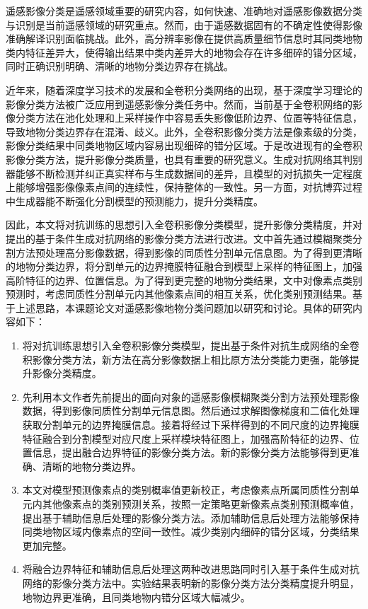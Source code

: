 \begin{cabstract}
  遥感影像分类是遥感领域重要的研究内容，如何快速、准确地对遥感影像数据分类与识别是当前遥感领域的研究重点。然而，由于遥感数据固有的不确定性使得影像准确解译识别面临挑战。此外，高分辨率影像在提供高质量细节信息时其同类地物类内特征差异大，使得输出结果中类内差异大的地物会存在许多细碎的错分区域，同时正确识别明确、清晰的地物分类边界存在挑战。

  近年来，随着深度学习技术的发展和全卷积分类网络的出现，基于深度学习理论的影像分类方法被广泛应用到遥感影像分类任务中。然而，当前基于全卷积网络的影像分类方法在池化处理和上采样操作中容易丢失影像低阶边界、位置等特征信息，导致地物分类边界存在混淆、歧义。此外，全卷积影像分类方法是像素级的分类，影像分类结果中同类地物区域内容易出现细碎的错分区域。于是改进现有的全卷积影像分类方法，提升影像分类质量，也具有重要的研究意义。生成对抗网络其判别器能够不断检测并纠正真实样布与生成数据间的差异，且模型的对抗损失一定程度上能够增强影像像素点间的连续性，保持整体的一致性。另一方面，对抗博弈过程中生成器能不断强化分割模型的预测能力，提升分类精度。
  
  因此，本文将对抗训练的思想引入全卷积影像分类模型，提升影像分类精度，并对提出的基于条件生成对抗网络的影像分类方法进行改进。文中首先通过模糊聚类分割方法预处理高分影像数据，得到影像的同质性分割单元信息图。为了得到更清晰的地物分类边界，将分割单元的边界掩膜特征融合到模型上采样的特征图上，加强高阶特征的边界、位置信息。为了得到更完整的地物分类结果，文中对像素点类别预测时，考虑同质性分割单元内其他像素点间的相互关系，优化类别预测结果。基于上述思路，本课题论文对遥感影像地物分类问题加以研究和讨论。具体的研究内容如下：
  \begin{enumerate}[(1)]
    \item 将对抗训练思想引入全卷积影像分类模型，提出基于条件对抗生成网络的全卷积影像分类方法，新方法在高分影像数据上相比原方法分类能力更强，能够提升影像分类精度。
    \item 先利用本文作者先前提出的面向对象的遥感影像模糊聚类分割方法预处理影像数据，得到影像同质性分割单元信息图。然后通过求解图像梯度和二值化处理获取分割单元的边界掩膜信息。接着将经过下采样得到的不同尺度的边界掩膜特征融合到分割模型对应尺度上采样模块特征图上，加强高阶特征的边界、位置信息，提出融合边界特征的影像分类方法。新的影像分类方法能够得到更准确、清晰的地物分类边界。
    \item 本文对模型预测像素点的类别概率值更新校正，考虑像素点所属同质性分割单元内其他像素点的类别预测关系，按照一定策略更新像素点类别预测概率值，提出基于辅助信息后处理的影像分类方法。添加辅助信息后处理方法能够保持同类地物区域内像素点的空间一致性。减少类别内细碎的错分区域，分类结果更加完整。
    \item 将融合边界特征和辅助信息后处理这两种改进思路同时引入基于条件生成对抗网络的影像分类方法中。实验结果表明新的影像分类方法分类精度提升明显，地物边界更准确，且同类地物内错分区域大幅减少。
  \end{enumerate}
\end{cabstract}

